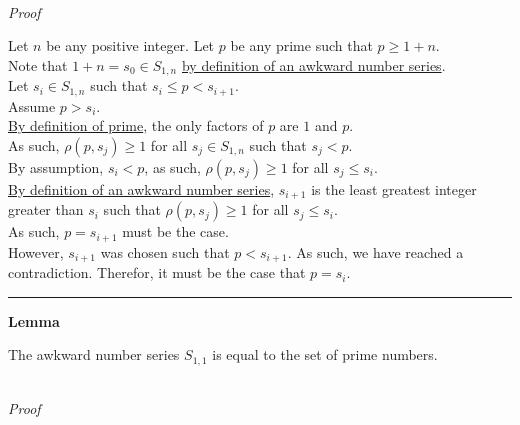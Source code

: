 \documentclass[a4paper,12pt]{article}
\begin{document}
\noindent \\
\textit{Proof}

\noindent Let $n$ be any positive integer. Let $p$ be any prime such that $p \geq 1 + n$.\\

\noindent Note that $1 + n = s_0 \in S_{1, n}$ \hyperlink{definition:awkward_number_series}{by definition of an awkward number series}.\\

\noindent Let $s_i \in S_{1, n}$ such that $s_i \leq p < s_{i + 1}$.\\

\noindent Assume $p > s_i$.\\

\noindent \hyperlink{definition:prime_numbers}{By definition of prime}, the only factors of $p$ are $1$ and $p$.\\

\noindent As such, $\rho(p, s_j) \geq 1$ for all $s_j \in S_{1, n}$ such that $s_j < p$.\\

\noindent By assumption, $s_i < p$, as such, $\rho(p, s_j) \geq 1$ for all $s_j \leq s_i$.\\

\noindent \hyperlink{definition:awkward_number_series}{By definition of an awkward number series}, $s_{i + 1}$ is the least greatest integer greater than $s_i$ such that $\rho(p, s_j) \geq 1$ for all $s_j \leq s_i$.\\

\noindent As such, $p = s_{i + 1}$ must be the case.\\

\noindent However, $s_{i + 1}$ was chosen such that $p < s_{i + 1}$. As such, we have reached a contradiction. Therefor, it must be the case that $p = s_i$.

\begin{center}
\noindent\rule{8cm}{0.4pt}
\end{center}





\label{lemma:prime_asn}
\hypertarget{lemma:prime_asn}{}
\begin{tcolorbox}
\textbf{Lemma}

The awkward number series $S_{1, 1}$ is equal to the set of prime numbers.
\end{tcolorbox}

\noindent \\
\textit{Proof}
\end{document}
